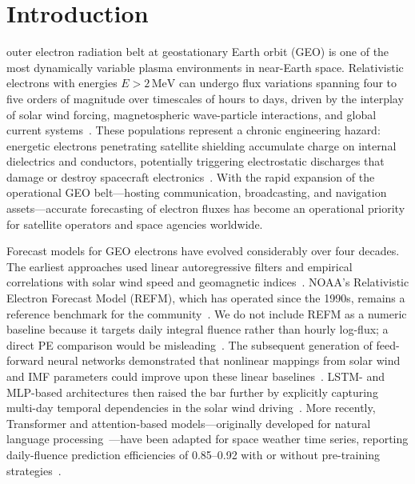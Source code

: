 \documentclass{ieeeaccess}
\begin{document}
\section{Introduction}
\label{sec:introduction}
 outer electron radiation belt at geostationary Earth orbit
(GEO) is one of the most dynamically variable plasma environments in near-Earth
space. Relativistic electrons with energies \(E>2\,\mathrm{MeV}\) can undergo
flux variations spanning four to five orders of magnitude over timescales of
hours to days, driven by the interplay of solar wind forcing, magnetospheric
wave-particle interactions, and global current systems~\cite{b1,b2,b3}. These
populations represent a chronic engineering hazard: energetic electrons
penetrating satellite shielding accumulate charge on internal dielectrics and
conductors, potentially triggering electrostatic discharges that damage or
destroy spacecraft electronics~\cite{b1}. With the rapid expansion of the
operational GEO belt---hosting communication, broadcasting, and navigation
assets---accurate forecasting of electron fluxes has become an operational
priority for satellite operators and space agencies worldwide.

Forecast models for GEO electrons have evolved considerably over four decades.
The earliest approaches used linear autoregressive filters and empirical
correlations with solar wind speed and geomagnetic indices~\cite{b4,b5}.
NOAA's Relativistic Electron Forecast Model (REFM), which has operated since
the 1990s, remains a reference benchmark for the community~\cite{b5}.
We do not include REFM as a numeric baseline because it targets daily integral
fluence rather than hourly log-flux; a direct PE comparison would be
misleading~\cite{b5}.
The subsequent generation of feed-forward neural networks demonstrated that
nonlinear mappings from solar wind and IMF parameters could improve upon these
linear baselines~\cite{b7,b8}. LSTM- and MLP-based architectures then raised the bar
further by explicitly capturing multi-day temporal dependencies in the
solar wind driving~\cite{b9,b10,b11,b12}. More recently, Transformer and
attention-based models---originally developed for natural language
processing~\cite{b13}---have been adapted for space weather time series,
reporting daily-fluence prediction efficiencies of 0.85--0.92 with or without
pre-training strategies~\cite{b14,b15,b16}.
\end{document}
